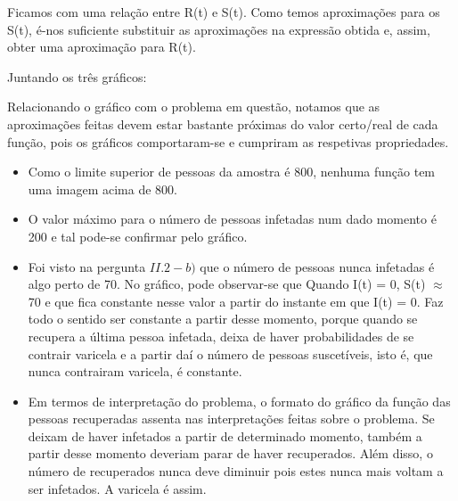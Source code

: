 \documentclass[portuguese, a4paper]{article}
\begin{document}
		Ficamos com uma relação entre R(t) e S(t). Como temos aproximações para os S(t), 
		é-nos suficiente substituir as aproximações na expressão obtida e, assim, obter uma aproximação para R(t).
		
		Juntando os três gráficos:
		
		
		Relacionando o gráfico com o problema em questão, notamos que as aproximações feitas devem estar
		bastante próximas do valor certo/real de cada função, pois os gráficos comportaram-se e cumpriram as respetivas propriedades.
		
		
		\begin{itemize}
		\item Como o limite superior de pessoas da amostra é 800, nenhuma função tem uma imagem acima de 800.
		\item O valor máximo para o número de pessoas infetadas num dado momento é 200 e tal pode-se confirmar pelo gráfico.
		\item Foi visto na pergunta $II.2-b)$ que o número de pessoas nunca infetadas é algo perto de 70. %
		No gráfico, pode observar-se que Quando I(t) = 0, S(t) $\approx$ 70 e que fica constante nesse valor a partir do instante em que I(t) = 0.
		Faz todo o sentido ser constante a partir desse momento, porque quando se recupera a última pessoa infetada, deixa de haver probabilidades
		de se contrair varicela e a partir daí o número de pessoas suscetíveis, isto é, que nunca contrairam varicela, é constante.
		\item Em termos de interpretação do problema, o formato do gráfico da função das pessoas recuperadas assenta nas interpretações
		feitas sobre o problema.
		Se deixam de haver infetados a partir de determinado momento, 
		também a partir desse momento deveriam parar de haver recuperados.
		Além disso, o número de recuperados nunca deve diminuir pois estes nunca mais voltam a ser infetados. A varicela é assim.
		\end{itemize}
		
\end{document}
